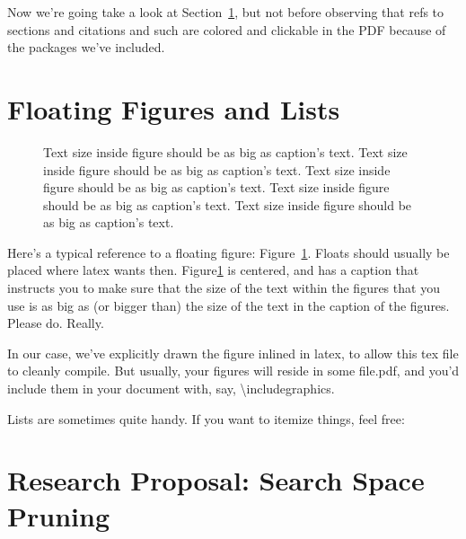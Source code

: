 Now we're going take a look at Section~\ref{sec:figs}, but not before
observing that refs to sections and citations and such are colored and
clickable in the PDF because of the packages we've included.

\section{Floating Figures and Lists}
\label{sec:figs}


\begin{figure}
\begin{center}
\end{center}
\caption{\label{fig:vectors} Text size inside figure should be as big as
  caption's text. Text size inside figure should be as big as
  caption's text. Text size inside figure should be as big as
  caption's text. Text size inside figure should be as big as
  caption's text. Text size inside figure should be as big as
  caption's text. }
\end{figure}


Here's a typical reference to a floating figure:
Figure~\ref{fig:vectors}. Floats should usually be placed where latex
wants then. Figure\ref{fig:vectors} is centered, and has a caption
that instructs you to make sure that the size of the text within the
figures that you use is as big as (or bigger than) the size of the
text in the caption of the figures. Please do. Really.

In our case, we've explicitly drawn the figure inlined in latex, to
allow this tex file to cleanly compile. But usually, your figures will
reside in some file.pdf, and you'd include them in your document
with, say, \textbackslash{}includegraphics.

Lists are sometimes quite handy. If you want to itemize things, feel
free:

\section{Research Proposal: Search Space Pruning}

